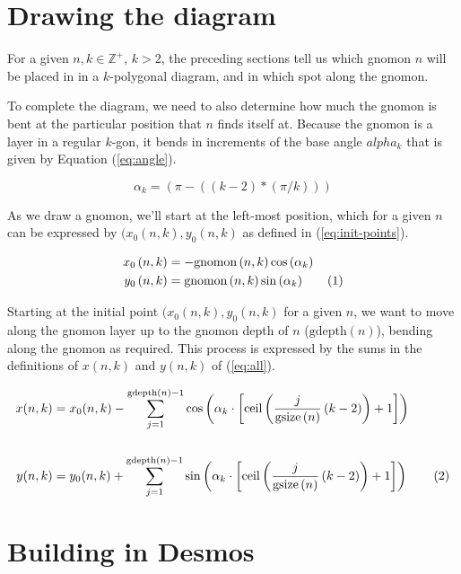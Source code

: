 \documentclass[notitlepage]{report}
\newcommand\numberthis{\addtocounter{equation}{1}\tag{\theequation}}
\begin{document}
\section*{Drawing the diagram}

For a given $n,k \in \mathbb{Z}^{+}$, $k > 2$, the preceding sections tell us which gnomon $n$ will be placed in in a $k$-polygonal diagram, and in which spot along the gnomon. 

To complete the diagram, we need to also determine how much the gnomon is bent at the particular position that $n$ finds itself at. Because the gnomon is a layer in a regular $k$-gon, it bends in increments of the base angle $alpha_k$ that is given by Equation (\ref{eq:angle}).


\begin{equation}
    \alpha_k=\left(\pi-((k-2)*(\pi/k))\right)
\label{eq:angle}
\end{equation}

As we draw a gnomon, we'll start at the left-most position, which for a given $n$ can be expressed by $(x_0(n,k),y_0(n,k)$ as defined in (\ref{eq:init-points}).

\begin{align*}
    x_0\left(n,k\right) &= -\text{gnomon}\left(n,k\right)\cos{(\alpha_k)} \\
    y_0\left(n,k\right) &=
    \text{gnomon}\left(n,k\right)\sin{(\alpha_k)} 
    \numberthis
    \label{eq:init-points}
\end{align*}

Starting at the initial point $(x_0(n,k),y_0(n,k)$ for a given $n$, we want to move along the gnomon layer up to the gnomon depth of $n$ ($\text{gdepth}(n)$), bending along the gnomon as required. This process is expressed by the sums in the definitions of $x(n,k)$ and $y(n,k)$ of (\ref{eq:all}).

\begin{align*}
x(n,k) &= x_0(n,k) - \sum_{j=1}^{\text{gdepth}\left(n\right)-1}\cos\left(\alpha_{k}\cdot\left[\operatorname{ceil}\left(\frac{j}{\text{gsize}\left(n\right)}\left(k-2\right)\right)+1\right]\right)\\
\\
y(n,k) &= y_0(n,k) + \sum_{j=1}^{\text{gdepth}\left(n\right)-1}\sin\left(\alpha_k\cdot\left[\operatorname{ceil}\left(\frac{j}{\text{gsize}\left(n\right)}\left(k-2\right)\right)+1\right]\right)
\numberthis
\label{eq:all}
\end{align*}

\section*{Building in Desmos}
\end{document}
